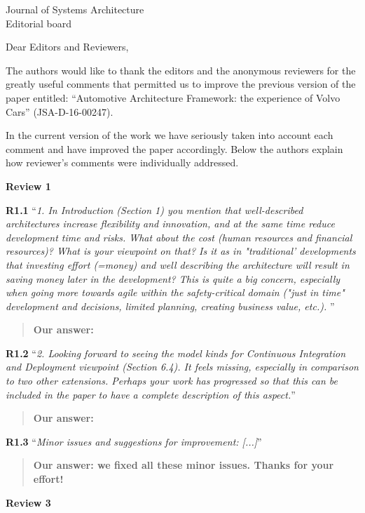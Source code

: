 \documentclass[a4paper,10pt]{letter}
\newcommand{\review}[1]{\hrulefill\par{\Large\textbf{Review #1}}}
\begin{document}
\begin{letter}{Journal of Systems Architecture\\
    Editorial board}

\opening{Dear Editors and Reviewers,}

The authors would like to thank the editors and the anonymous reviewers for the greatly useful comments that permitted us to improve the previous version of the paper entitled: ``Automotive Architecture Framework: the experience of Volvo Cars'' (JSA-D-16-00247). 

In the current version of the work we have seriously taken into account each comment and have improved the paper accordingly. Below the authors explain how reviewer's comments were individually addressed.


\review{1}
%

\textbf{R1.1} ``\textit{1. In Introduction (Section 1) you mention that well-described architectures increase flexibility and innovation, and at the same time reduce development time and risks. What about the cost (human resources and financial resources)? What is your viewpoint on that? Is it as in "traditional' developments that investing effort (=money) and well describing the architecture will result in saving money later in the development? This is quite a big concern, especially when going more towards agile within the safety-critical domain ("just in time" development and decisions, limited planning, creating business value, etc.). }''
\begin{quote}
\textbf{Our answer: }
\end{quote}

\textbf{R1.2} ``\textit{2. Looking forward to seeing the model kinds for Continuous Integration and Deployment viewpoint (Section 6.4). It feels missing, especially in comparison to two other extensions. Perhaps your work has progressed so that this can be included in the paper to have a complete description of this aspect.}''
\begin{quote}
\textbf{Our answer: }
\end{quote}

\textbf{R1.3} ``\textit{Minor issues and suggestions for improvement:
[...]}''
\begin{quote}
\textbf{Our answer: we fixed all these minor issues. Thanks for your effort!}
\end{quote}

\review{3}


\end{letter}
\end{document}
